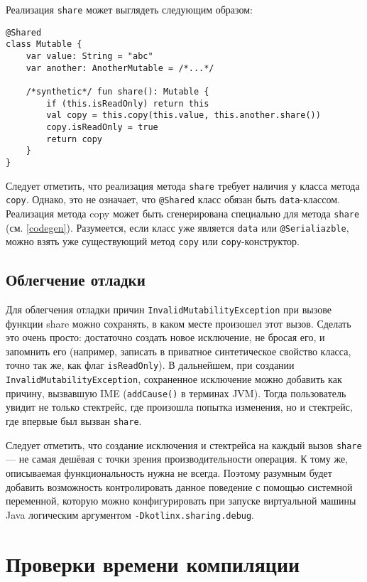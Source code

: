 \documentclass[specification,annotation,times]{itmo-student-thesis}
\begin{document}
Реализация \texttt{share} может выглядеть следующим образом:

\begin{lstlisting}[float=h!,caption={Реализация share}]
@Shared
class Mutable {
	var value: String = "abc"
	var another: AnotherMutable = /*...*/
	
	/*synthetic*/ fun share(): Mutable {
		if (this.isReadOnly) return this
		val copy = this.copy(this.value, this.another.share())
		copy.isReadOnly = true
		return copy
	}
}
\end{lstlisting}

Следует отметить, что реализация метода \texttt{share} требует наличия у класса метода \texttt{copy}.
Однако, это не означает, что \texttt{@Shared} класс обязан быть \texttt{data}-классом.
Реализация метода copy может быть сгенерирована специально для метода \texttt{share} (см. \ref{codegen}).
Разумеется, если класс уже является \texttt{data} или \texttt{@Serialiazble}, можно взять уже существующий метод \texttt{copy} или \texttt{copy}-конструктор.

\subsection{Облегчение отладки}

Для облегчения отладки причин \texttt{InvalidMutabilityException} при вызове функции share можно сохранять, в каком месте произошел этот вызов.
Сделать это очень просто: достаточно создать новое исключение, не бросая его, и запомнить его (например, записать в приватное синтетическое свойство класса, точно так же, как флаг \texttt{isReadOnly}).
В дальнейшем, при создании \texttt{InvalidMutabilityException}, сохраненное исключение можно добавить как причину, вызвавшую IME (\texttt{addCause()} в терминах JVM).
Тогда пользователь увидит не только стектрейс, где произошла попытка изменения, но и стектрейс, где впервые был вызван \texttt{share}.

Следует отметить, что создание исключения и стектрейса на каждый вызов \texttt{share} --- не самая дешёвая с точки зрения производительности операция.
К тому же, описываемая функциональность нужна не всегда. Поэтому разумным будет добавить возможность контролировать данное поведение с помощью системной переменной, которую можно конфигурировать при запуске виртуальной машины Java логическим аргументом \texttt{-Dkotlinx.sharing.debug}.

\section{Проверки времени компиляции}\label{compile_checks}
\end{document}
